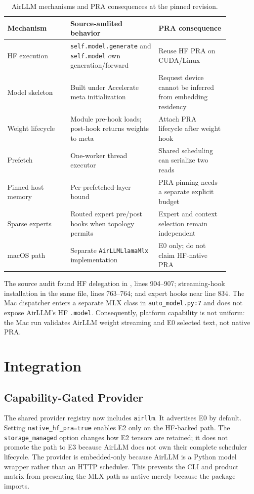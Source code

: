 \documentclass[10pt]{article}
\begin{document}
\begin{table}[t]
\centering
\caption{AirLLM mechanisms and PRA consequences at the pinned revision.}
\label{tab:audit}
\small
\begin{tabular}{p{0.25\linewidth}p{0.35\linewidth}p{0.29\linewidth}}
\toprule
Mechanism & Source-audited behavior & PRA consequence \\
\midrule
HF execution & \texttt{self.model.generate} and \texttt{self.model} own generation/forward & Reuse HF PRA on CUDA/Linux \\
Model skeleton & Built under Accelerate meta initialization & Request device cannot be inferred from embedding residency \\
Weight lifecycle & Module pre-hook loads; post-hook returns weights to meta & Attach PRA lifecycle after weight hook \\
Prefetch & One-worker thread executor & Shared scheduling can serialize two reads \\
Pinned host memory & Per-prefetched-layer bound & PRA pinning needs a separate explicit budget \\
Sparse experts & Routed expert pre/post hooks when topology permits & Expert and context selection remain independent \\
macOS path & Separate \texttt{AirLLMLlamaMlx} implementation & E0 only; do not claim HF-native PRA \\
\bottomrule
\end{tabular}
\end{table}

The source audit found HF delegation in , lines 904--907;
streaming-hook installation in the same file, lines 763--764; and expert hooks
near line 834. The Mac
dispatcher enters a separate MLX class in \texttt{auto\_model.py:7} and does
not expose AirLLM's HF \texttt{.model}. Consequently, platform capability is
not uniform: the Mac run validates AirLLM weight streaming and E0 selected text,
not native PRA.

\section{Integration}

\subsection{Capability-Gated Provider}

The shared provider registry now includes \texttt{airllm}. It advertises E0 by
default. Setting \texttt{native\_hf\_pra=true} enables E2 only on the
HF-backed path. The \texttt{storage\_managed} option changes how E2 tensors are
retained; it does not promote the path to E3 because AirLLM does not own their
complete scheduler lifecycle. The provider is embedded-only because AirLLM is
a Python model wrapper rather than an HTTP scheduler. This prevents the CLI and
product matrix from presenting the MLX path as native merely because the
package imports.
\end{document}
